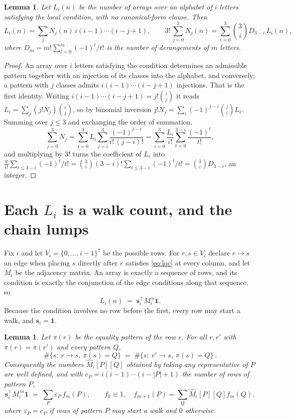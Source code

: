 \documentclass[11pt,a4paper]{article}
\theoremstyle{plain}
\newtheorem{lemma}[theorem]{Lemma}
\theoremstyle{definition}
\begin{document}
\begin{lemma}\label{lem:inv}
Let $L_i(n)$ be the number of arrays over an alphabet of $i$ letters satisfying the local
condition, with no canonical-form clause. Then
\[
L_i(n)=\sum_j N_j(n)\,i(i-1)\cdots(i-j+1),
\qquad
3!\,\sum_{j=0}^{3}N_j(n)=\sum_{i=0}^{3}\binom{3}{i}D_{3-i}\,L_i(n),
\]
where $D_m=m!\sum_{t=0}^{m}(-1)^t/t!$ is the number of derangements of $m$ letters.
\end{lemma}

\begin{proof}
An array over $i$ letters satisfying the condition determines an admissible pattern together
with an injection of its classes into the alphabet, and conversely; a pattern with $j$
classes admits $i(i-1)\cdots(i-j+1)$ injections. That is the first identity. Writing
$i(i-1)\cdots(i-j+1)=j!\binom{i}{j}$ it reads $L_i=\sum_j (j!N_j)\binom{i}{j}$, so by
binomial inversion $j!N_j=\sum_{i}(-1)^{j-i}\binom{j}{i}L_i$. Summing over
$j\le 3$ and exchanging the order of summation,
\[
\sum_{j=0}^{3}N_j=\sum_{i=0}^{3}L_i\sum_{j=i}^{3}\frac{(-1)^{j-i}}{i!\,(j-i)!}
=\sum_{i=0}^{3}\frac{L_i}{i!}\sum_{t=0}^{3-i}\frac{(-1)^t}{t!} ,
\]
and multiplying by $3!$ turns the coefficient of $L_i$ into
$\frac{3!}{i!}\sum_{t\le 3-i}(-1)^t/t!=\binom{3}{i}(3-i)!\sum_{t\le 3-i}(-1)^t/t!
=\binom{3}{i}D_{3-i}$, an integer.
\end{proof}

\section{Each $L_i$ is a walk count, and the chain lumps}

Fix $i$ and let $V_i=\{0,\dots,i-1\}^{7}$ be the possible rows. For $r,s\in V_i$
declare $r\to s$ an edge when placing $s$ directly after $r$ satisfies \eqref{eq:loc} at
every column, and let $M_i$ be the adjacency matrix. An array is exactly a sequence of
rows, and its condition is exactly the conjunction of the edge conditions along that
sequence, so
\[
L_i(n)\;=\;\mathbf{s}_i^{\!\top}M_i^{\,n}\mathbf{1} .
\]
Because the condition involves no row before the first, every
row may start a walk, and $\mathbf{s}_i=\mathbf{1}$.

\begin{lemma}\label{lem:lump}
Let $\pi(r)$ be the equality pattern of the row $r$. For all $r,r'$ with
$\pi(r)=\pi(r')$ and every pattern $Q$,
\[
\#\{s:\ r\to s,\ \pi(s)=Q\}\;=\;\#\{s:\ r'\to s,\ \pi(s)=Q\}\, .
\]
Consequently the numbers $\widehat M_i[P][Q]$ obtained by taking any representative of $P$
are well defined, and with $e_P=i(i-1)\cdots(i-|P|+1)$ the number of rows of pattern $P$,
\[
\mathbf{s}_i^{\!\top}M_i^{\,m}\mathbf{1}\;=\;\sum_P \varepsilon_P\,f_m(P),
\qquad f_0\equiv1,\quad f_{m+1}(P)=\sum_Q\widehat M_i[P][Q]f_m(Q),
\]
where $\varepsilon_P=e_P$ if rows of pattern $P$ may start a walk and $0$ otherwise.
\end{lemma}
\end{document}

